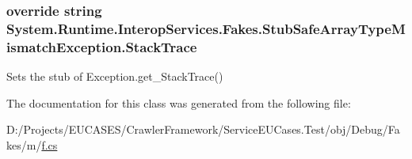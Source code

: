 \hypertarget{class_system_1_1_runtime_1_1_interop_services_1_1_fakes_1_1_stub_safe_array_type_mismatch_exception_a300f4941739dd4aae00866a19fbb5ca1}{
\subsubsection[{Stack\-Trace}]{\setlength{\rightskip}{0pt plus 5cm}override string System.\-Runtime.\-Interop\-Services.\-Fakes.\-Stub\-Safe\-Array\-Type\-Mismatch\-Exception.\-Stack\-Trace\hspace{0.3cm}{\ttfamily [get]}}}\label{class_system_1_1_runtime_1_1_interop_services_1_1_fakes_1_1_stub_safe_array_type_mismatch_exception_a300f4941739dd4aae00866a19fbb5ca1}


Sets the stub of Exception.\-get\-\_\-\-Stack\-Trace()



The documentation for this class was generated from the following file\-:\begin{DoxyCompactItemize}
\item 
D\-:/\-Projects/\-E\-U\-C\-A\-S\-E\-S/\-Crawler\-Framework/\-Service\-E\-U\-Cases.\-Test/obj/\-Debug/\-Fakes/m/\hyperlink{m_2f_8cs}{f.\-cs}\end{DoxyCompactItemize}
